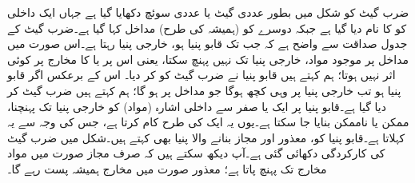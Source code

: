 ضرب گیٹ کو شکل  میں بطور عددی گیٹ یا عددی سوئچ دکھایا گیا ہے جہاں ایک داخلی  کو   کا نام دیا گیا ہے جبکہ دوسرے کو (ہمیشہ کی طرح) مداخل کہا گیا ہے۔ضرب گیٹ کے جدول صداقت  سے واضح ہے کہ جب تک قابو پنیا  ہو، خارجی پنیا  رہتا ہے۔اس صورت میں مداخل پر موجود مواد، خارجی پنیا تک نہیں پہنچ سکتا، یعنی اس پر  یا  کا مخارج پر کوئی اثر نہیں ہوتا؛ ہم کہتے ہیں قابو پنیا نے ضرب گیٹ کو  کر دیا۔ اس کے برعکس اگر قابو پنیا  ہو تب خارجی پنیا پر وہی کچھ ہوگا جو مداخل پر ہو گا؛ ہم کہتے ہیں ضرب گیٹ   کر دیا گیا ہے۔قابو پنیا پر ایک یا صفر سے داخلی اشارہ (مواد) کو خارجی پنیا تک پہنچنا، ممکن یا ناممکن بنایا جا سکتا ہے۔یوں یہ ایک   کی طرح کام کرتا ہے، جس کی وجہ سے یہ   کہلاتا ہے۔قابو پنیا کو، معذور اور مجاز بنانے والا پنیا بھی کہتے ہیں۔شکل  میں ضرب گیٹ کی کارکردگی دکھائی گئی ہے۔آپ دیکھ سکتے ہیں کہ صرف مجاز صورت میں مواد مخارج تک پہنچ پاتا ہے؛ معذور صورت میں مخارج ہمیشہ پست رہے گا۔


